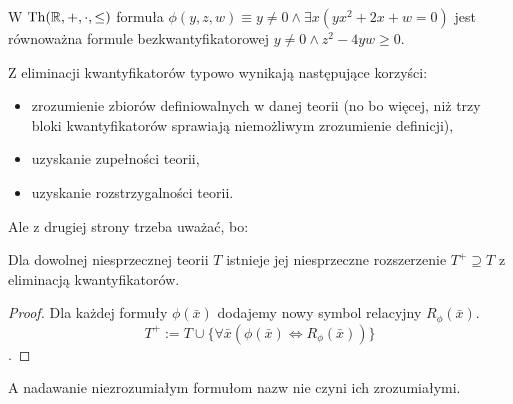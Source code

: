 \documentclass{article}
\begin{document}
\begin{prz}
	W $\text{Th}(\mathbb{R}, +, \cdot, \leq)$ formuła $\phi(y, z, w) \equiv y \neq 0 \wedge \exists x (yx^2 + 2x + w = 0)$ jest równoważna formule bezkwantyfikatorowej $y \neq 0 \wedge z^2 - 4yw \geq 0$.
\end{prz}

Z eliminacji kwantyfikatorów typowo wynikają następujące korzyści:
\begin{itemize}
	\item zrozumienie zbiorów definiowalnych w danej teorii (no bo więcej, niż trzy bloki kwantyfikatorów sprawiają niemożliwym zrozumienie definicji),
	\item uzyskanie zupełności teorii,
	\item uzyskanie rozstrzygalności teorii.
\end{itemize}

Ale z drugiej strony trzeba uważać, bo:

\begin{stw} Dla dowolnej niesprzecznej teorii $T$ istnieje jej niesprzeczne rozszerzenie $T^+ \supseteq T$ z eliminacją kwantyfikatorów.
\end{stw}
\begin{proof}
	Dla każdej formuły $\phi(\bar{x})$ dodajemy nowy symbol relacyjny $R_{\phi}(\bar{x})$.
	\[T^+ := T \cup \{\forall \bar{x} (\phi(\bar{x}) \iff R_{\phi}(\bar{x}))\}\].
\end{proof}
A nadawanie niezrozumiałym formułom nazw nie czyni ich zrozumiałymi.
\end{document}
